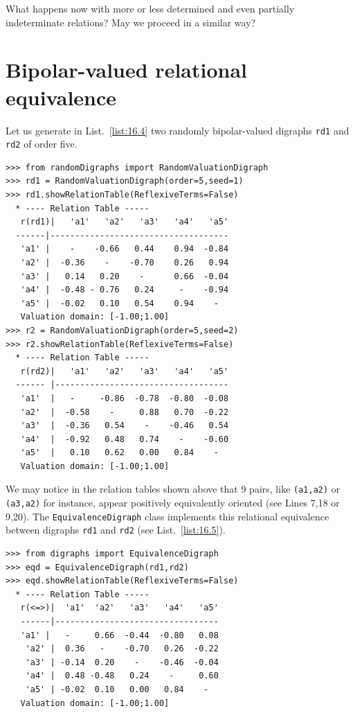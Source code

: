 What happens now with more or less determined and even partially indeterminate relations? May we proceed in a similar way?

\section{Bipolar-valued relational equivalence}
\label{sec:17.2}

Let us generate in List.~\vref{list:16.4} two randomly bipolar-valued digraphs \texttt{rd1} and \texttt{rd2} of order five.
\begin{lstlisting}[caption={Two random bipolar-valued digraphs},label=list:16.4]
>>> from randomDigraphs import RandomValuationDigraph
>>> rd1 = RandomValuationDigraph(order=5,seed=1)
>>> rd1.showRelationTable(ReflexiveTerms=False)
  * ---- Relation Table -----
   r(rd1)|   'a1'   'a2'   'a3'   'a4'   'a5'	  
  ------|------------------------------------
   'a1' |    - 	  -0.66	  0.44	  0.94	-0.84	 
   'a2' |  -0.36    - 	 -0.70	  0.26	 0.94	 
   'a3' |   0.14   0.20	   - 	  0.66	-0.04	 
   'a4' |  -0.48 - 0.76	  0.24	   -  	-0.94	 
   'a5' |  -0.02   0.10	  0.54	  0.94    - 	 
   Valuation domain: [-1.00;1.00]
>>> r2 = RandomValuationDigraph(order=5,seed=2)
>>> r2.showRelationTable(ReflexiveTerms=False)
  * ---- Relation Table -----
   r(rd2)|   'a1'   'a2'   'a3'   'a4'   'a5'	  
  ------ |-----------------------------------
   'a1'  |   -     -0.86  -0.78  -0.80  -0.08	 
   'a2'  |  -0.58    -     0.88   0.70  -0.22	 
   'a3'  |  -0.36   0.54    -    -0.46   0.54	 
   'a4'  |  -0.92   0.48   0.74    -    -0.60	 
   'a5'  |   0.10   0.62   0.00   0.84    - 	 
   Valuation domain: [-1.00;1.00]
\end{lstlisting}
We may notice in the relation tables shown above that 9 pairs, like \texttt{(a1,a2)} or \texttt{(a3,a2)} for instance, appear positively equivalently oriented (see Lines 7,18 or 9,20). The \texttt{EquivalenceDigraph} class implements this relational equivalence between digraphs \texttt{rd1} and \texttt{rd2} (see List.~\vref{list:16.5}).
\begin{lstlisting}[caption={Bipolar-valued Equivalence Digraph},label=list:16.5]
>>> from digraphs import EquivalenceDigraph
>>> eqd = EquivalenceDigraph(rd1,rd2)
>>> eqd.showRelationTable(ReflexiveTerms=False)
  * ---- Relation Table -----
   r(<=>)|  'a1'  'a2'   'a3'   'a4'   'a5'	  
   ------|---------------------------------
   'a1' |   - 	  0.66  -0.44  -0.80   0.08	 
    'a2' |  0.36   -    -0.70   0.26  -0.22	 
    'a3' | -0.14  0.20    -    -0.46  -0.04	 
    'a4' |  0.48 -0.48   0.24    -     0.60	 
    'a5' | -0.02  0.10   0.00   0.84    - 	 
   Valuation domain: [-1.00;1.00]
\end{lstlisting}

